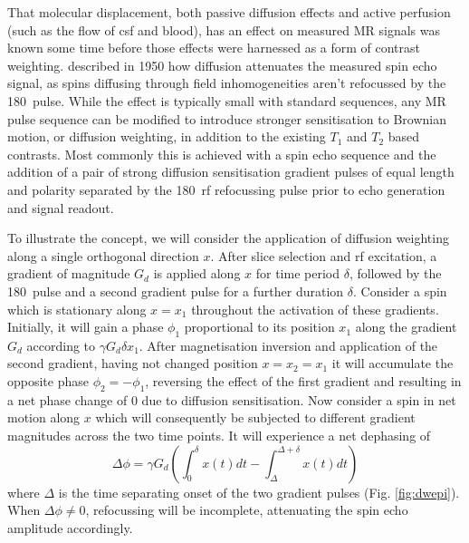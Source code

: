 That molecular displacement, both passive diffusion effects and active perfusion (such as the flow of \gls{csf} and blood\autocite{LeBihan1988}), has an effect on measured MR signals was known some time before those effects were harnessed as a form of contrast weighting.
\textcite{Hahn1950} described in 1950 how diffusion attenuates the measured spin echo signal, as spins diffusing through field inhomogeneities aren't refocussed by the 180\textdegree\ pulse.
While the effect is typically small with standard sequences, any MR pulse sequence can be modified to introduce stronger sensitisation to Brownian motion, or diffusion weighting, in addition to the existing $T_1$ and $T_2$ based contrasts.
Most commonly this is achieved with a spin echo sequence and the addition of a pair of strong diffusion sensitisation gradient pulses of equal length and polarity separated by the 180\textdegree\ \gls{rf} refocussing pulse prior to echo generation and signal readout.

To illustrate the concept, we will consider the application of diffusion weighting along a single orthogonal direction $x$.
After slice selection and \gls{rf} excitation, a gradient of magnitude $G_d$ is applied along $x$ for time period $\delta$, followed by the 180\textdegree\ pulse and a second gradient pulse for a further duration $\delta$.
Consider a spin which is stationary along $x=x_1$ throughout the activation of these gradients.
Initially, it will gain a phase $\phi_1$ proportional to its position $x_1$ along the gradient $G_d$ according to $\gamma G_d \delta x_1$.
After magnetisation inversion and application of the second gradient, having not changed position $x=x_2=x_1$ it will accumulate the opposite phase $\phi_2 = -\phi_1$, reversing the effect of the first gradient and resulting in a net phase change of $0$ due to diffusion sensitisation.
Now consider a spin in net motion along $x$ which will consequently be subjected to different gradient magnitudes across the two time points.
It will experience a net dephasing of
\begin{equation}
  \Delta\phi = \gamma G_d (\int_0^{\delta} x(t) dt - \int_{\Delta}^{\Delta+\delta} x(t) dt)
\end{equation}
where $\Delta$ is the time separating onset of the two gradient pulses (Fig. \ref{fig:dwepi}).
When $\Delta\phi \neq 0$, refocussing will be incomplete, attenuating the spin echo amplitude accordingly.

